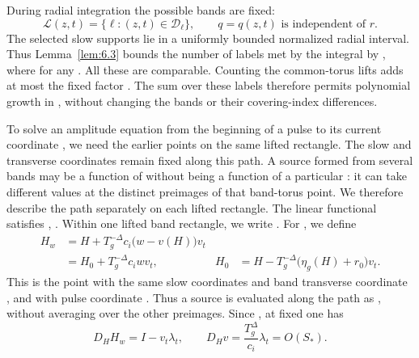 During radial integration the possible bands are fixed:
\[
  \mathcal L(z,t)=\{\ell:(z,t)\in \mathcal D_\ell\},
  \qquad q=q(z,t)\text{ is independent of }r.
\]
The selected slow supports lie in a uniformly bounded normalized radial
interval. Thus Lemma~\ref{lem:6.3} bounds the number of labels met by the
integral by , where
 for any
. All these
 are comparable. Counting the common-torus lifts
adds at most the fixed factor . The sum
over these labels therefore permits polynomial growth in
, without changing the bands or their covering-index
differences.

To solve an amplitude equation from the beginning of a pulse to its current
coordinate , we need the earlier points on the same
lifted rectangle. The slow and transverse coordinates remain fixed along this
path. A source formed from several bands may be a function of
 without being a function of a particular
: it can take different values at the distinct
preimages of that band-torus point. We therefore describe the path separately
on each lifted rectangle. The linear functional
 satisfies
,
. Within one lifted band rectangle, we
write
.
For , we define
\begin{equation}
  \begin{aligned}
    H_w&=H+T_g^{-\Delta}c_i\bigl(w-v(H)\bigr)v_t\\
       &=H_0+T_g^{-\Delta}c_iwv_t,
       & H_0&=H-T_g^{-\Delta}\bigl(\eta_g(H)+r_0\bigr)v_t.
  \end{aligned}
  \tag{6.21}\label{eq:6.21}
\end{equation}
This is the point with the same slow coordinates and band transverse
coordinate , and with pulse coordinate
. Thus a source
 is evaluated along the path as
, without averaging over the other
preimages. Since ,
at fixed  one has
\begin{equation}
  D_HH_w=I-v_t\lambda_t,
  \qquad D_Hv=\frac{T_g^\Delta}{c_i}\lambda_t=O(S_*).
  \tag{6.22}\label{eq:6.22}
\end{equation}

